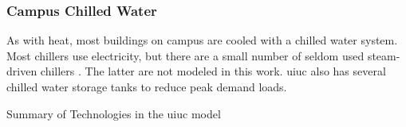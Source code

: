 \subsubsection{Campus Chilled Water}

As with heat, most buildings on campus are cooled with a chilled water system.
Most chillers use electricity, but there are a small number of seldom used
steam-driven chillers \cite{affiliated_engineers_inc_utilities_2015}. The latter
are not modeled in this work. \gls{uiuc} also has several chilled water storage
tanks to reduce peak demand loads.

\begin{sidewaystable}
  \centering
  \caption{Summary of Technologies in the \gls{uiuc} model}
  \label{tab:uiuc-tech}
  \resizebox{\textwidth}{!}{
  
  } %
\end{sidewaystable}
